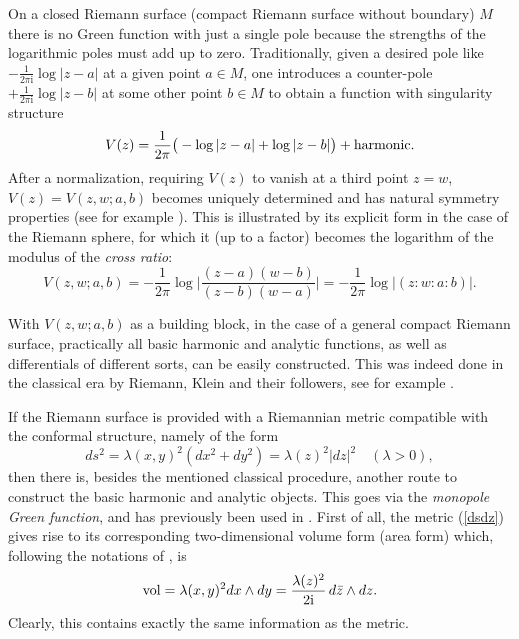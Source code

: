 \documentclass[reqno,12pt]{article}
\theoremstyle{plain}
\theoremstyle{definition}
\numberwithin{equation}{section}
\numberwithin{figure}{section}
\def\I{\mathrm{i}}
\begin{document}
On a closed Riemann surface (compact Riemann surface without boundary) $M$ there is no Green function with just a single pole because the
strengths of the logarithmic poles must add up to zero. Traditionally, given a desired pole like $-\frac{1}{2\pi\I}\log|z-a|$
at a given point $a\in M$, one introduces a counter-pole $+\frac{1}{2\pi\I}\log |z-b|$ at some other point $b\in M$ to obtain
a function with singularity structure 
\begin{equation}\label{V}
V(z)=\frac{1}{2\pi}\big(-\log |z-a|+\log |z-b|\big)+{\rm harmonic}.
\end{equation}
After a normalization, requiring $V(z)$ to vanish at a third point $z=w$, $V(z)=V(z,w;a,b)$ becomes uniquely determined
and has  natural symmetry properties (see for example \cite{Gustafsson-Sebbar-2012}). 
This is illustrated by its explicit form in the case of the Riemann sphere, for which it
(up to a factor) becomes the logarithm of the modulus of the {\it cross ratio}:
\begin{equation}\label{Vcross ratio}
V(z,w;a,b)=-\frac{1}{2\pi}\log\big| \frac{(z-a)(w-b)}{(z-b)(w-a)}\big|=-\frac{1}{2\pi}\log|(z:w:a:b)|.
\end{equation}

With $V(z,w;a,b)$ as a building block, in the case of a general compact Riemann surface, 
practically all basic harmonic and analytic functions,
as well as differentials of different sorts, can be easily constructed. This was indeed done in the classical era by Riemann, Klein
and their followers, see for example \cite{Weyl-1964, Schiffer-Spencer-1954}. 

If the Riemann surface is provided with a Riemannian metric compatible with the conformal structure, namely of the form
\begin{equation}\label{dsdz}
ds^2=\lambda(x,y)^2(dx^2+dy^2)=\lambda(z)^2 |dz|^2 \quad (\lambda>0),
\end{equation}
then there is, besides the mentioned classical procedure, another route to construct the basic harmonic and analytic objects.
This goes via the {\it monopole Green function}, and has previously been used in \cite{Lang-1988, Takhtajan-2001}.
First of all, the metric (\ref{dsdz}) gives rise to its corresponding two-dimensional volume form (area form) which,
following the notations of \cite{Frankel-2012}, is 
\begin{equation}\label{volume form}
{\rm vol}=\lambda(x,y)^2 dx\wedge dy= \frac{\lambda (z)^2}{2\I}\,d\bar{z}\wedge dz. 
\end{equation}
Clearly, this contains exactly the same information as the metric.
\end{document}
